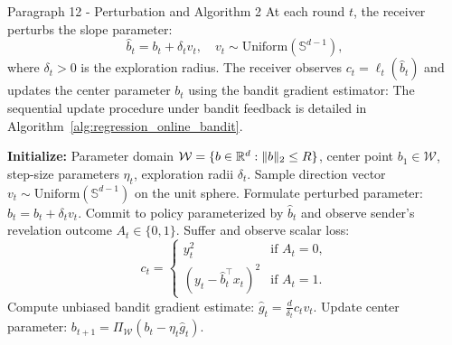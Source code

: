 \begin{sourceblock}{Paragraph 12 - Perturbation and Algorithm 2}
At each round $t$, the receiver perturbs the slope parameter:
\begin{equation}
    \label{eq:perturbed_parameter}
    \hat{b}_t = b_t + \delta_t v_t,
    \quad v_t \sim \text{Uniform}(\mathbb{S}^{d-1}),
\end{equation}
where $\delta_t > 0$ is the exploration radius. The receiver observes $c_t = \ell_t(\hat{b}_t)$ and updates the center parameter $b_t$ using the bandit gradient estimator:
The sequential update procedure under bandit feedback is detailed in Algorithm~\ref{alg:regression_online_bandit}.

\begin{algorithm}[htbp]
\caption{Strategic Bandit Online Gradient Descent (SB-OGD)}
\label{alg:regression_online_bandit}
\begin{algorithmic}[1]
\State \textbf{Initialize:} Parameter domain $\mathcal{W} = \{b \in \mathbb{R}^d : \|b\|_2 \le R\}$, center point $b_1 \in \mathcal{W}$, step-size parameters $\eta_t$, exploration radii $\delta_t$.
    \State Sample direction vector $v_t \sim \text{Uniform}(\mathbb{S}^{d-1})$ on the unit sphere.
    \State Formulate perturbed parameter: $\hat{b}_t = b_t + \delta_t v_t$.
    \State Commit to policy parameterized by $\hat{b}_t$ and observe sender's revelation outcome $A_t \in \{0, 1\}$.
    \State Suffer and observe scalar loss: 
    \begin{equation*}
        c_t = \begin{cases}
            y_t^2 & \text{if } A_t = 0, \\
            (y_t - \hat{b}_t^\top x_t)^2 & \text{if } A_t = 1.
        \end{cases}
    \end{equation*}
    \State Compute unbiased bandit gradient estimate: $\hat{g}_t = \frac{d}{\delta_t} c_t v_t$.
    \State Update center parameter: $b_{t+1} = \Pi_{\mathcal{W}}\left( b_t - \eta_t \hat{g}_t \right)$.
\EndFor
\end{algorithmic}
\end{algorithm}
\end{sourceblock}

\begin{faqblock}
\faqanswers
{}
\end{faqblock}

